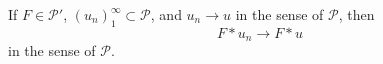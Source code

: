 If $F \in \mathcal{P}'$, $(u_n)_{1}^{\infty} \subset \mathcal{P}$, and $u_n \to u$ in the sense of $\mathcal{P}$, then
$$F * u_n \to F * u$$
in the sense of $\mathcal{P}$.
